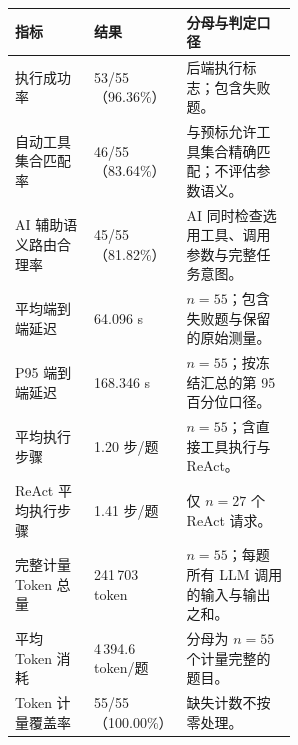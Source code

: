 \begingroup
\small
\setlength{\tabcolsep}{5pt}
\renewcommand{\arraystretch}{1.16}
\begin{tabularx}{\linewidth}{@{}p{0.29\linewidth}p{0.27\linewidth}>{\raggedright\arraybackslash}X@{}}
\toprule
指标 & 结果 & 分母与判定口径 \\
\midrule
执行成功率 & 53/55（96.36\%） & 后端执行标志；包含失败题。 \\
自动工具集合匹配率 & 46/55（83.64\%） & 与预标允许工具集合精确匹配；不评估参数语义。 \\
AI 辅助语义路由合理率 & 45/55（81.82\%） & AI 同时检查选用工具、调用参数与完整任务意图。 \\
平均端到端延迟 & 64.096 s & $n=55$；包含失败题与保留的原始测量。 \\
P95 端到端延迟 & 168.346 s & $n=55$；按冻结汇总的第 95 百分位口径。 \\
平均执行步骤 & 1.20 步/题 & $n=55$；含直接工具执行与 ReAct。 \\
ReAct 平均执行步骤 & 1.41 步/题 & 仅 $n=27$ 个 ReAct 请求。 \\
完整计量 Token 总量 & 241\,703 token & $n=55$；每题所有 LLM 调用的输入与输出之和。 \\
平均 Token 消耗 & 4\,394.6 token/题 & 分母为 $n=55$ 个计量完整的题目。 \\
Token 计量覆盖率 & 55/55（100.00\%） & 缺失计数不按零处理。 \\
\bottomrule
\end{tabularx}
\par\vspace{4pt}{\footnotesize 自动工具匹配与 AI 语义路由是不同指标。评分未作独立人工复核；执行成功不等于答案正确。\par}
\endgroup
